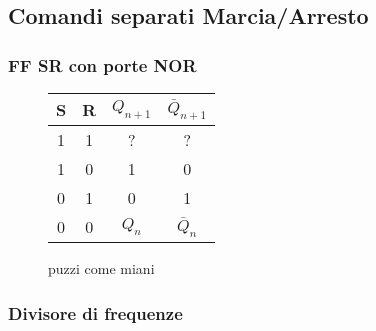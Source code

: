 \subsection*{Comandi separati Marcia/Arresto}




\subsubsection*{FF SR con porte NOR}


\begin{figure}[H]
		\centering
		{\renewcommand{\arraystretch}{1.1}%
		\begin{tabular}{c|c|c|c}
		S & R & $Q_{n+1}$ & $\bar Q_{n+1}$  \\
		\hline
		1 & 1  & ?&?\\
		\hline
		1&0 & 1 & 0\\
		\hline
		0&1 & 0  &1\\
		\hline
		0&0 & $Q_n$ & $\bar Q_n$\\
		\end{tabular}}
		\label{tab11:nor}
		\caption{puzzi come miani}
        \end{figure}


\subsubsection*{Divisore di frequenze}




